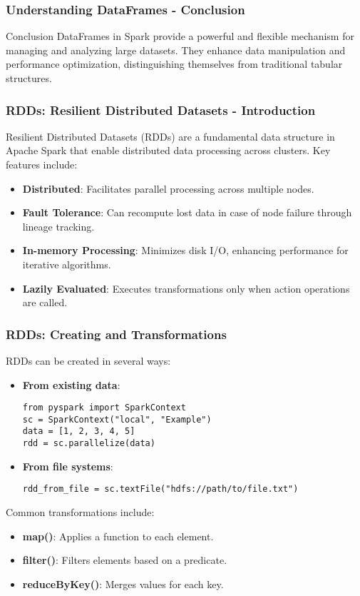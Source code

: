 \documentclass[aspectratio=169]{beamer}
\begin{document}
\begin{frame}[fragile]
    \frametitle{Understanding DataFrames - Conclusion}
    \begin{block}{Conclusion}
        DataFrames in Spark provide a powerful and flexible mechanism for managing and analyzing large datasets. They enhance data manipulation and performance optimization, distinguishing themselves from traditional tabular structures.
    \end{block}
\end{frame}

\begin{frame}[fragile]
    \frametitle{RDDs: Resilient Distributed Datasets - Introduction}
    Resilient Distributed Datasets (RDDs) are a fundamental data structure in Apache Spark that enable distributed data processing across clusters. Key features include:
    \begin{itemize}
        \item \textbf{Distributed}: Facilitates parallel processing across multiple nodes.
        \item \textbf{Fault Tolerance}: Can recompute lost data in case of node failure through lineage tracking.
        \item \textbf{In-memory Processing}: Minimizes disk I/O, enhancing performance for iterative algorithms.
        \item \textbf{Lazily Evaluated}: Executes transformations only when action operations are called.
    \end{itemize}
\end{frame}

\begin{frame}[fragile]
    \frametitle{RDDs: Creating and Transformations}
    RDDs can be created in several ways:
    \begin{itemize}
        \item \textbf{From existing data}:
        \begin{lstlisting}
from pyspark import SparkContext
sc = SparkContext("local", "Example")
data = [1, 2, 3, 4, 5]
rdd = sc.parallelize(data)
        \end{lstlisting}

        \item \textbf{From file systems}:
        \begin{lstlisting}
rdd_from_file = sc.textFile("hdfs://path/to/file.txt")
        \end{lstlisting}
    \end{itemize}
    
    Common transformations include:
    \begin{itemize}
        \item \textbf{map()}: Applies a function to each element.
        \item \textbf{filter()}: Filters elements based on a predicate.
        \item \textbf{reduceByKey()}: Merges values for each key.
    \end{itemize}
\end{frame}
\end{document}
